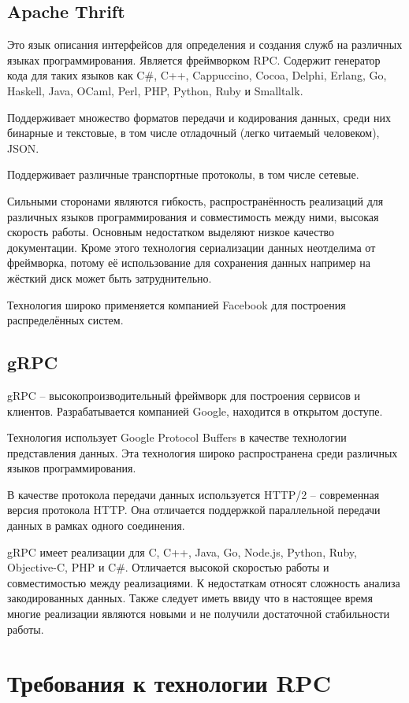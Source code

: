 \subsection{Apache Thrift}
Это язык описания интерфейсов для определения и создания служб
на различных языках программирования. Является фреймворком RPC.
Содержит генератор кода для таких языков как C\#, C++, Cappuccino, Cocoa,
Delphi, Erlang, Go, Haskell, Java, OCaml, Perl, PHP, Python, Ruby и Smalltalk.

Поддерживает множество форматов передачи и кодирования данных, среди них
бинарные и текстовые, в том числе отладочный (легко читаемый человеком), JSON.

Поддерживает различные транспортные протоколы, в том числе сетевые.

Сильными сторонами являются гибкость, распространённость реализаций
для различных языков программирования и совместимость между ними, высокая
скорость работы.
Основным недостатком выделяют низкое качество документации.
Кроме этого технология сериализации данных неотделима от фреймворка,
потому её использование для сохранения данных например на жёсткий диск
может быть затруднительно.

Технология широко применяется компанией Facebook для построения распределённых
систем.

\subsection{gRPC}
gRPC -- высокопроизводительный фреймворк для построения сервисов и клиентов.
Разрабатывается компанией Google, находится в открытом доступе.

Технология использует Google Protocol Buffers в качестве технологии
представления данных. Эта технология широко распространена среди
различных языков программирования.

В качестве протокола передачи данных используется HTTP/2 -- современная
версия протокола HTTP. Она отличается поддержкой параллельной передачи
данных в рамках одного соединения.

gRPC имеет реализации для C, C++, Java, Go, Node.js, Python, Ruby, Objective-C,
PHP и C\#. Отличается высокой скоростью работы и совместимостью между
реализациями. К недостаткам относят сложность анализа закодированных данных.
Также следует иметь ввиду что в настоящее время многие реализации являются
новыми и не получили достаточной стабильности работы.

\section{Требования к технологии RPC}

